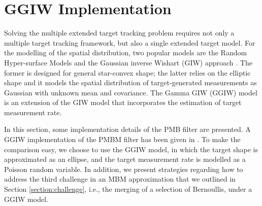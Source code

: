 \documentclass[journal]{IEEEtran}
\begin{document}



\section{GGIW Implementation}
Solving the multiple extended target tracking problem requires not only a multiple target tracking framework, but also a single extended target model. For the modelling of the spatial distribution, two popular models are the Random Hyper-surface Models \cite{hypersurface} and the Gaussian inverse Wishart (GIW) approach \cite{randomMatrix,randomMatrix2}. The former is designed for general star-convex shape; the latter relies on the elliptic shape and it models the spatial distribution of target-generated measurements as Gaussian with unknown mean and covariance. The Gamma GIW (GGIW) model \cite{phdextended,cphdextended} is an extension of the GIW model that incorporates the estimation of target measurement rate.

In this section, some implementation details of the PMB filter are presented. A GGIW implementation of the PMBM filter has been given in \cite{pmbmextended2}. To make the comparison easy, we choose to use the GGIW model, in which the target shape is approximated as an ellipse, and the target measurement rate is modelled as a Poisson random variable. In addition, we present strategies regarding how to address the third challenge in an MBM approximation that we outlined in Section \ref{section:challenge}, i.e., the merging of a selection of Bernoullis, under a GGIW model. 
\end{document}

